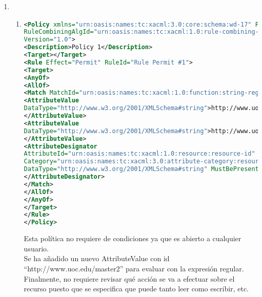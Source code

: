 \documentclass[10pt,a4paper]{article}
\begin{document}
\begin{enumerate}[label=\alph*]
\item
\begin{enumerate}[label=(\arabic*)]
\item 
\begin{lstlisting}[language=XML]
<Policy xmlns="urn:oasis:names:tc:xacml:3.0:core:schema:wd-17" PolicyId="1"
RuleCombiningAlgId="urn:oasis:names:tc:xacml:1.0:rule-combining-algorithm:first-applicable"
Version="1.0">
<Description>Policy 1</Description>
<Target></Target>
<Rule Effect="Permit" RuleId="Rule Permit #1">
<Target>
<AnyOf>
<AllOf>
<Match MatchId="urn:oasis:names:tc:xacml:1.0:function:string-regexp-match">
<AttributeValue
DataType="http://www.w3.org/2001/XMLSchema#string">http://www.uoc.edu/master1
</AttributeValue>
<AttributeValue
DataType="http://www.w3.org/2001/XMLSchema#string">http://www.uoc.edu/master2
</AttributeValue>
<AttributeDesignator
AttributeId="urn:oasis:names:tc:xacml:1.0:resource:resource-id"
Category="urn:oasis:names:tc:xacml:3.0:attribute-category:resource"
DataType="http://www.w3.org/2001/XMLSchema#string" MustBePresent="true">
</AttributeDesignator>
</Match>
</AllOf>
</AnyOf>
</Target>
</Rule>
</Policy>
\end{lstlisting}
Esta política no requiere de condiciones ya que es abierto a cualquier usuario. \\Se ha añadido un nuevo AttributeValue con id\\ ``http://www.uoc.edu/master2'' para evaluar con la expresión regular. Finalmente, no requiere revisar qué acción se va a efectuar sobre el recurso puesto que se especifica que puede tanto leer como escribir, etc. 
\end{enumerate}


\end{enumerate}
\end{document}
